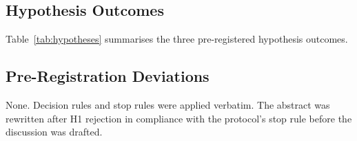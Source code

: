 \subsection{Hypothesis Outcomes}

Table~\ref{tab:hypotheses} summarises the three pre-registered
hypothesis outcomes.



\subsection{Pre-Registration Deviations}

None. Decision rules and stop rules were applied verbatim. The abstract
was rewritten after H1 rejection in compliance with the protocol's
stop rule before the discussion was drafted.
